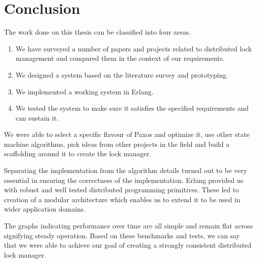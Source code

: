 \chapter{Conclusion}
\label{chapter:conclusion}

The work done on this thesis can be classified into four areas.

\begin{enumerate}
  \item We have surveyed a number of papers and projects related to distributed
    lock management and compared them in the context of our requirements.
  \item We designed a system based on the literature survey and prototyping.
  \item We implemented a working system in Erlang.
  \item We tested the system to make sure it satisfies the specified
    requirements and can sustain it.
\end{enumerate}

We were able to select a specific flavour of Paxos and optimize it, use other
state machine algorithms, pick ideas from other projects in the field and build 
a scaffolding around it to create the lock manager. 

Separating the implementation from the algorithm details turned out
to be very essential in ensuring the correctness of the implementation. Erlang
provided us with robust and well tested distributed programming primitives. 
These led to creation of a modular architecture which enables us to extend
it to be used in wider application domains.

The graphs indicating performance over time are all simple and remain flat
across signifying steady operation. Based on these benchmarks and tests, we
can say that we were able to achieve our goal of creating a strongly consistent
distributed lock manager.


